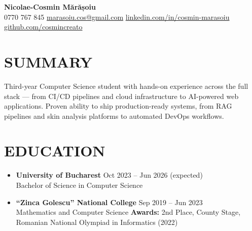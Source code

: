 \documentclass[10pt, letterpaper]{article}
\begin{document}
\begin{center}
  {\LARGE \textbf{Nicolae-Cosmin Mărășoiu}} \\[3pt]
  0770 767 845 \quad
  \href{mailto:marasoiu.cos@gmail.com}{marasoiu.cos@gmail.com} \quad
  \href{https://www.linkedin.com/in/cosmin-marasoiu}{linkedin.com/in/cosmin-marasoiu} \quad
  \href{https://github.com/cosmincreato}{github.com/cosmincreato}
\end{center}

\section*{SUMMARY}
Third-year Computer Science student with hands-on experience across the full stack --- from CI/CD pipelines and cloud infrastructure to AI-powered web applications. Proven ability to ship production-ready systems, from RAG pipelines and skin analysis platforms to automated DevOps workflows.

\section*{EDUCATION}
\begin{itemize}
  \item \textbf{University of Bucharest} \hfill Oct 2023 -- Jun 2026 (expected) \\
        Bachelor of Science in Computer Science

  \item \textbf{``Zinca Golescu'' National College} \hfill Sep 2019 -- Jun 2023 \\
        Mathematics and Computer Science \quad \textbf{Awards:} 2nd Place, County Stage, Romanian National Olympiad in Informatics (2022)
\end{itemize}
\end{document}
